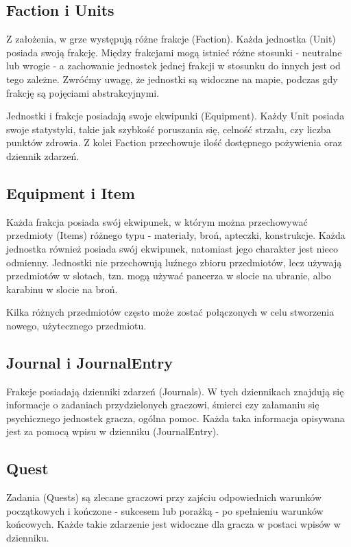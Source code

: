 \documentclass[licencjacka]{pracamgr}
\begin{document}
    \subsection{Faction i Units}
      Z założenia, w grze występują różne frakcje (Faction). Każda jednostka (Unit) posiada swoją frakcję. Między
      frakcjami mogą istnieć różne stosunki - neutralne lub wrogie - a zachowanie jednostek jednej frakcji w stosunku
      do innych jest od tego zależne. Zwróćmy uwagę, że jednostki są widoczne na mapie, podczas gdy frakcję są
      pojęciami abstrakcyjnymi.

      Jednostki i frakcje posiadają swoje ekwipunki (Equipment). Każdy Unit posiada swoje statystyki, takie jak
      szybkość poruszania się, celność strzału, czy liczba punktów zdrowia. Z kolei Faction przechowuje ilość
      dostępnego pożywienia oraz dziennik zdarzeń.

    \subsection{Equipment i Item}
      Każda frakcja posiada swój ekwipunek, w którym można przechowywać przedmioty (Items) różnego typu - materiały,
      broń, apteczki, konstrukcje. Każda jednostka również posiada swój ekwipunek, natomiast jego charakter jest nieco
      odmienny. Jednostki nie przechowują luźnego zbioru przedmiotów, lecz używają przedmiotów w slotach, tzn. mogą
      używać pancerza w slocie na ubranie, albo karabinu w slocie na broń.

      Kilka różnych przedmiotów często może zostać połączonych w celu stworzenia nowego, użytecznego przedmiotu.

    \subsection{Journal i JournalEntry}
      Frakcje posiadają dzienniki zdarzeń (Journals). W tych dziennikach znajdują się informacje o zadaniach
      przydzielonych graczowi, śmierci czy załamaniu się psychicznego jednostek gracza, ogólna pomoc. Każda taka
      informacja opisywana jest za pomocą wpisu w dzienniku (JournalEntry).

    \subsection{Quest}
      Zadania (Quests) są zlecane graczowi przy zajściu odpowiednich warunków początkowych i kończone - sukcesem lub
      porażką - po spełnieniu warunków końcowych. Każde takie zdarzenie jest widoczne dla gracza w postaci wpisów w
      dzienniku.
\end{document}
